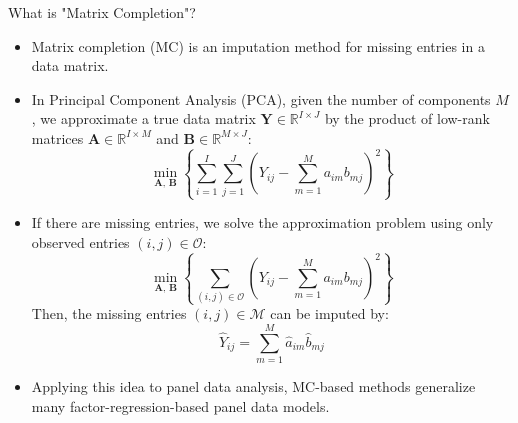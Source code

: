 \documentclass[xcolor=svgnames,aspectratio=169]{beamer}
\begin{document}
\begin{frame}{What is "Matrix Completion"?}
    \begin{itemize}
        \item Matrix completion (MC) is an imputation method for missing entries in a data matrix.
        
        \item In Principal Component Analysis (PCA), given the number of components $M$, we approximate a true data matrix $\mathbf{Y}\in\mathbb{R}^{I\times J}$ by the product of low-rank matrices $\mathbf{A}\in\mathbb{R}^{I\times M}$ and $\mathbf{B}\in\mathbb{R}^{M\times J}$:
        \[
        \min_{\mathbf{A},\,\mathbf{B}}\left\{
        \sum_{i=1}^{I}\sum_{j=1}^{J}\left(Y_{ij}-\sum_{m=1}^{M}a_{im}b_{mj}\right)^2
        \right\}
        \]

        \item If there are missing entries, we solve the approximation problem using only observed entries $(i,j)\in\mathcal{O}$:
        \[
        \min_{\mathbf{A},\,\mathbf{B}}\left\{
        \sum_{(i,j)\in \mathcal{O}}\left(Y_{ij}-\sum_{m=1}^{M}a_{im}b_{mj}\right)^2
        \right\}
        \]
        Then, the missing entries $(i,j)\in\mathcal{M}$ can be imputed by:
        \[
        \hat{Y}_{ij}=\sum_{m=1}^{M}\hat{a}_{im}\hat{b}_{mj}
        \]

        \item Applying this idea to panel data analysis, MC-based methods generalize many factor-regression-based panel data models.
    \end{itemize}
\end{frame}
\end{document}
